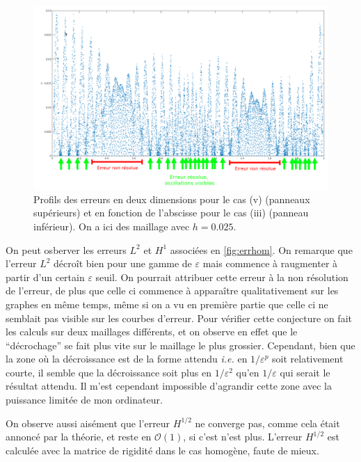 \documentclass[11pt]{article}
\newcommand{\ie}{\emph{i.e.} }
\begin{document}
\begin{figure}
  \includegraphics[width=.9\textwidth]{SolutionPbHomogeneise/non_res_osc}
  \caption{Profils des erreurs en deux dimensions pour le cas (v) (panneaux supérieurs) et en fonction de l'abscisse pour le cas (iii) (panneau
    inférieur). On a ici des maillage avec $h=0.025$.}
  \label{fig:diffs}
\end{figure}

On peut osberver les erreurs $L^2$ et $H^1$ associées en \autoref{fig:errhom}. On remarque que l'erreur $L^2$ décroît bien pour une gamme de
$\varepsilon$ mais commence à raugmenter à partir d'un certain $\varepsilon$ seuil. On pourrait attribuer cette erreur à la non résolution de
l'erreur, de plus que celle ci commence à apparaître qualitativement sur les graphes en même temps, même si on a vu en première partie que celle ci ne
semblait pas visible sur les courbes d'erreur. Pour vérifier cette conjecture on fait les calculs sur deux maillages différents, et on observe en effet
que le ``décrochage'' se fait plus vite sur le maillage le plus grossier. Cependant, bien que la zone où la décroissance est de la forme
attendu \ie en $1/\varepsilon^p$ soit relativement courte, il semble que la décroissance soit plus en $1/\varepsilon^2$ qu'en $1/\varepsilon$ qui
serait le résultat attendu. Il m'est cependant impossible d'agrandir cette zone avec la puissance limitée de mon ordinateur.

On observe aussi aisément que l'erreur $H^{1/2}$ ne converge pas, comme cela était annoncé par la théorie, et reste en $\mathcal{O}(1)$, si c'est n'est
plus. L'erreur $H^{1/2}$ est calculée avec la matrice de rigidité dans le cas homogène, faute de mieux. 
\end{document}
